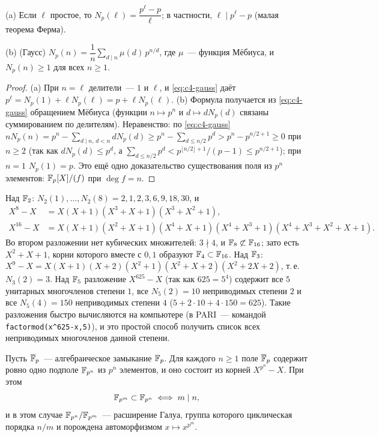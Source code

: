 \begin{corollary}[4.22c]
\textup{(a)} Если $\ell$ простое, то $N_p(\ell)=\dfrac{p^\ell-p}\ell$; в частности, $\ell\mid p^\ell-p$ \textup(малая теорема
Ферма\textup).

\textup{(b)} \textup(Гаусс\textup) $N_p(n)=\dfrac1n\sum_{d\mid n}\mu(d)\,p^{n/d}$, где $\mu$~--- функция Мёбиуса, и $N_p(n)\ge1$ для
всех $n\ge1$.
\end{corollary}

\begin{proof}
(a) При $n=\ell$ делители~--- $1$ и $\ell$, и \eqref{eq:c4-gauss} даёт $p^\ell=N_p(1)+\ell N_p(\ell)=p+\ell N_p(\ell)$.
(b) Формула получается из \eqref{eq:c4-gauss} обращением Мёбиуса (функции $n\mapsto p^n$ и $d\mapsto dN_p(d)$ связаны
суммированием по делителям). Неравенство: по \eqref{eq:c4-gauss}
$nN_p(n)=p^n-\sum_{d\mid n,\,d<n}dN_p(d)\ge p^n-\sum_{d\le n/2}p^d>p^n-p^{n/2+1}\ge0$ при $n\ge2$ (так как $dN_p(d)\le p^d$,
а $\sum_{d\le n/2}p^d<p^{\lfloor n/2\rfloor+1}/(p-1)\le p^{n/2+1}$); при $n=1$ $N_p(1)=p$. Это ещё одно доказательство
существования поля из $p^n$ элементов: $\mathbb F_p[X]/(f)$ при $\deg f=n$.
\end{proof}

\begin{example}[4.22d]
Над $\mathbb F_2$: $N_2(1),\dots,N_2(8)=2,1,2,3,6,9,18,30$, и
\begin{align*}
X^8-X&=X(X+1)(X^3+X+1)(X^3+X^2+1),\\
X^{16}-X&=X(X+1)(X^2+X+1)(X^4+X+1)(X^4+X^3+1)(X^4+X^3+X^2+X+1).
\end{align*}
Во втором разложении нет кубических множителей: $3\nmid4$, и $\mathbb F_8\not\subset\mathbb F_{16}$; зато есть $X^2+X+1$, корни
которого вместе с $0,1$ образуют $\mathbb F_4\subset\mathbb F_{16}$. Над $\mathbb F_3$:
$X^9-X=X(X+1)(X+2)(X^2+1)(X^2+X+2)(X^2+2X+2)$, т.\,е.\ $N_3(2)=3$. Над $\mathbb F_5$ разложение $X^{625}-X$ (так как $625=5^4$)
содержит все $5$ унитарных многочленов степени $1$, все $N_5(2)=10$ неприводимых степени $2$ и все $N_5(4)=150$
неприводимых степени $4$ ($5+2\cdot10+4\cdot150=625$). Такие разложения быстро вычисляются на компьютере (в PARI~---
командой \texttt{factormod(x\^{}625-x,5)}), и это простой способ получить список всех неприводимых многочленов данной
степени.
\end{example}

\begin{proposition}[4.23]
Пусть $\overline{\mathbb F}_p$~--- алгебраическое замыкание $\mathbb F_p$. Для каждого $n\ge1$ поле $\overline{\mathbb F}_p$ содержит ровно одно подполе $\mathbb F_{p^n}$ из
$p^n$ элементов, и оно состоит из корней $X^{p^n}-X$. При этом
\[
\mathbb F_{p^m}\subset\mathbb F_{p^n}\iff m\mid n,
\]
и в этом случае $\mathbb F_{p^n}/\mathbb F_{p^m}$~--- расширение Галуа, группа которого циклическая порядка $n/m$ и порождена
автоморфизмом $x\mapsto x^{p^m}$.
\end{proposition}

